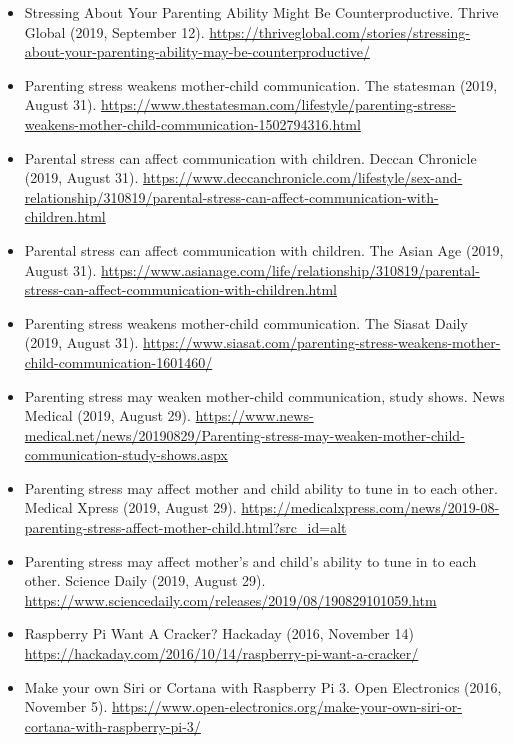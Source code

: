 \documentclass[10pt,a4paper]{altacv}
\begin{document}
\begin{fullwidth}
\begin{itemize}
			\item Stressing About Your Parenting Ability Might Be Counterproductive. Thrive Global (2019, September 12). \url{https://thriveglobal.com/stories/stressing-about-your-parenting-ability-may-be-counterproductive/}
			\item Parenting stress weakens mother-child communication. The statesman (2019, August 31). \url{https://www.thestatesman.com/lifestyle/parenting-stress-weakens-mother-child-communication-1502794316.html}
			\item Parental stress can affect communication with children. Deccan Chronicle (2019, August 31). \url{https://www.deccanchronicle.com/lifestyle/sex-and-relationship/310819/parental-stress-can-affect-communication-with-children.html}
			\item Parental stress can affect communication with children. The Asian Age (2019, August 31). \url{https://www.asianage.com/life/relationship/310819/parental-stress-can-affect-communication-with-children.html}
			\item Parenting stress weakens mother-child communication. The Siasat Daily (2019, August 31). \url{https://www.siasat.com/parenting-stress-weakens-mother-child-communication-1601460/}
			\item Parenting stress may weaken mother-child communication, study shows. News Medical (2019, August 29). \url{https://www.news-medical.net/news/20190829/Parenting-stress-may-weaken-mother-child-communication-study-shows.aspx}
			\item Parenting stress may affect mother and child ability to tune in to each other. Medical Xpress (2019, August 29). \url{https://medicalxpress.com/news/2019-08-parenting-stress-affect-mother-child.html?src_id=alt}
			\item Parenting stress may affect mother's and child's ability to tune in to each other. Science Daily (2019, August 29). \url{https://www.sciencedaily.com/releases/2019/08/190829101059.htm}	
			\item Raspberry Pi Want A Cracker? Hackaday (2016, November 14) \url{https://hackaday.com/2016/10/14/raspberry-pi-want-a-cracker/}
			\item Make your own Siri or Cortana with Raspberry Pi 3. Open Electronics (2016, November 5). \url{https://www.open-electronics.org/make-your-own-siri-or-cortana-with-raspberry-pi-3/}
			
		\end{itemize}
		


\end{fullwidth}
\end{document}
